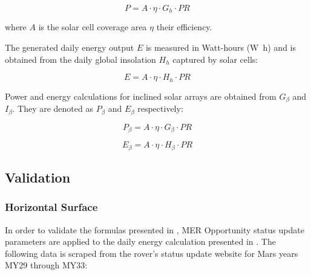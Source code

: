 \begin{equation}
  \label{eq:SA_power}
  P = A \cdot \eta \cdot G_{h} \cdot PR
\end{equation}

where $A$ is the solar cell coverage area $\eta$ their efficiency.

The generated daily energy output $E$ is measured in Watt-hours (\si{\watt\hour}) and is obtained from the daily global insolation $H_{h}$ captured by solar cells:

\begin{equation}
  \label{eq:SA_energy}
  E = A \cdot \eta \cdot H_{h} \cdot PR
\end{equation}

Power and energy calculations for inclined solar arrays are obtained from $G_{\beta}$ and $I_{\beta}$. They are denoted as $P_{\beta}$ and $E_{\beta}$ respectively:

\begin{equation}
  \label{eq:SA_slope_power}
  P_{\beta} = A \cdot \eta \cdot G_{\beta} \cdot PR
\end{equation}


\begin{equation}
  \label{eq:SA_slope_energy}
  E_{\beta} = A \cdot \eta \cdot H_{\beta} \cdot PR
\end{equation}

\subsection{Validation}
\label{sec:PowerAndEnergyPredictions:Validation}


\subsubsection{Horizontal Surface}
\label{sec:PowerAndEnergyPredictions:Validation:HorizontalSurface}

In order to validate the formulas presented in , \ac{MER} Opportunity status update parameters are applied to the daily energy calculation presented in . The following data is scraped from the rover's status update website for Mars years \ac{MY}29 through \ac{MY}33:

